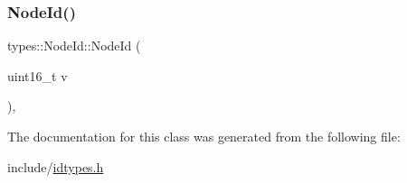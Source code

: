 \mbox{\label{classtypes_1_1_node_id_a66d4868f5e05b2a8e58aea724e9bcaa7}} 
\subsubsection{\texorpdfstring{NodeId()}{NodeId()}\hspace{0.1cm}{\footnotesize\ttfamily [2/2]}}
{\footnotesize\ttfamily types\+::\+Node\+Id\+::\+Node\+Id (\begin{DoxyParamCaption}\item[{uint16\+\_\+t}]{v }\end{DoxyParamCaption})\hspace{0.3cm}{\ttfamily [inline]}, {\ttfamily [explicit]}}



The documentation for this class was generated from the following file\+:\begin{DoxyCompactItemize}
\item 
include/\mbox{\hyperlink{idtypes_8h}{idtypes.\+h}}\end{DoxyCompactItemize}
